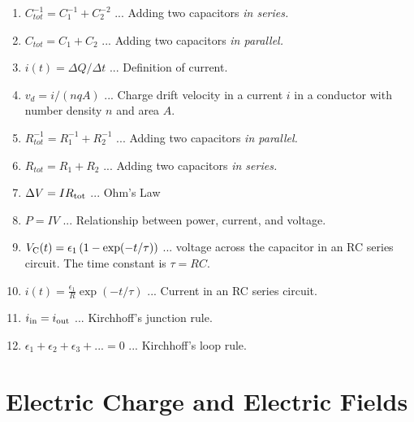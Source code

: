 \documentclass[10pt]{article}
\begin{document}
\begin{enumerate}
\item $C_{tot}^{-1} = C_1^{-1} + C_2^{-2}$ ... Adding two capacitors \textit{in series.}
\item $C_{tot} = C_1 + C_2$ ... Adding two capacitors \textit{in parallel.}
\item $i(t) = \Delta Q/\Delta t$ ... Definition of current.
\item $v_d = i/(nqA)$ ... Charge drift velocity in a current $i$ in a conductor with number density $n$ and area $A$.
\item $R_{tot}^{-1} = R_1^{-1} + R_2^{-1}$ ... Adding two capacitors \textit{in parallel.}
\item $R_{tot} = R_1 + R_2$ ... Adding two capacitors \textit{in series.}
\item $\Delta V = I R_{\rm tot}$ ... Ohm's Law
\item $P = I V$ ... Relationship between power, current, and voltage.
\item $V_{\rm C}(t) = \epsilon_1 \left(1 - \exp(-t/\tau)\right)$ ... voltage across the capacitor in an RC series circuit.  The time constant is $\tau = RC$.
\item $i(t) = \frac{\epsilon_1}{R} \exp(-t/\tau)$ ... Current in an RC series circuit.
\item $i_{\rm in} = i_{\rm out}$ ... Kirchhoff's junction rule.
\item $\epsilon_1 + \epsilon_2 + \epsilon_3 + ... = 0$ ... Kirchhoff's loop rule.
\end{enumerate}

\clearpage

\section{Electric Charge and Electric Fields}
\end{document}
